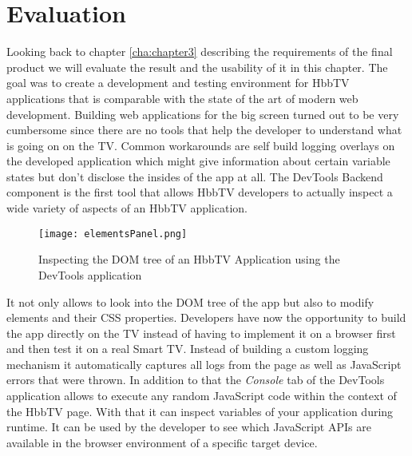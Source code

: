 
\chapter{Evaluation\label{cha:chapter6}}

Looking back to chapter \ref{cha:chapter3} describing the requirements of the final product we will evaluate the result and the usability of it in this chapter. The goal was to create a development and testing environment for HbbTV applications that is comparable with the state of the art of modern web development. Building web applications for the big screen turned out to be very cumbersome since there are no tools that help the developer to understand what is going on on the TV. Common workarounds are self build logging overlays on the developed application which might give information about certain variable states but don't disclose the insides of the app at all. The DevTools Backend component is the first tool that allows HbbTV developers to actually inspect a wide variety of aspects of an HbbTV application.

\begin{figure}[htb]
  \centering
  \hspace*{-0.7cm}
  \texttt{[image: elementsPanel.png]}\\
  \caption{Inspecting the DOM tree of an HbbTV Application using the DevTools application}\label{fig:elementsPanel}
\end{figure}

It not only allows to look into the DOM tree of the app but also to modify elements and their CSS properties. Developers have now the opportunity to build the app directly on the TV instead of having to implement it on a browser first and then test it on a real Smart TV. Instead of building a custom logging mechanism it automatically captures all logs from the page as well as JavaScript errors that were thrown. In addition to that the \textit{Console} tab of the DevTools application allows to execute any random JavaScript code within the context of the HbbTV page. With that it can inspect variables of your application during runtime. It can be used by the developer to see which JavaScript APIs are available in the browser environment of a specific target device.

